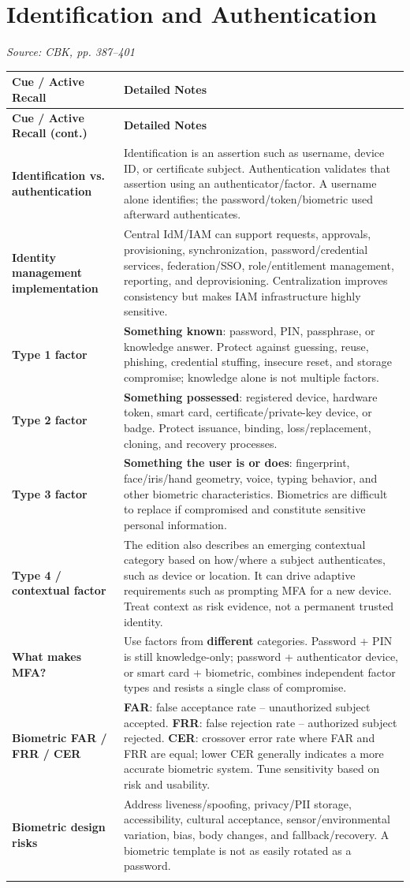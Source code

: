 \documentclass[10pt,letterpaper]{article}
\makeatletter
\newenvironment{cornell}{\rowcolors{2}{white}{notebg}\begin{longtable}{@{}>{\raggedright\arraybackslash\columncolor{cuebg}\color{navy}\bfseries}p{0.285\textwidth}>{\raggedright\arraybackslash}p{0.65\textwidth}@{}}\rowcolor{navy}\color{white}\textbf{Cue / Active Recall} & \color{white}\textbf{Detailed Notes}\\ \hline\endfirsthead\rowcolor{navy}\color{white}\textbf{Cue / Active Recall (cont.)} & \color{white}\textbf{Detailed Notes}\\ \hline\endhead}{\end{longtable}}
\newcommand{\noterow}[2]{#1 & #2\\\arrayrulecolor{line}\hline}\newcommand{\source}[1]{\par{\footnotesize\color{teal}\textit{Source: CBK, #1}}\par}
\makeatother
\begin{document}
\section{\color{navy}Identification and Authentication}
\source{pp. 387--401}
\begin{cornell}
\noterow{Identification vs. authentication}{Identification is an assertion such as username, device ID, or certificate subject. Authentication validates that assertion using an authenticator/factor. A username alone identifies; the password/token/biometric used afterward authenticates.}
\noterow{Identity management implementation}{Central IdM/IAM can support requests, approvals, provisioning, synchronization, password/credential services, federation/SSO, role/entitlement management, reporting, and deprovisioning. Centralization improves consistency but makes IAM infrastructure highly sensitive.}
\noterow{Type 1 factor}{\textbf{Something known}: password, PIN, passphrase, or knowledge answer. Protect against guessing, reuse, phishing, credential stuffing, insecure reset, and storage compromise; knowledge alone is not multiple factors.}
\noterow{Type 2 factor}{\textbf{Something possessed}: registered device, hardware token, smart card, certificate/private-key device, or badge. Protect issuance, binding, loss/replacement, cloning, and recovery processes.}
\noterow{Type 3 factor}{\textbf{Something the user is or does}: fingerprint, face/iris/hand geometry, voice, typing behavior, and other biometric characteristics. Biometrics are difficult to replace if compromised and constitute sensitive personal information.}
\noterow{Type 4 / contextual factor}{The edition also describes an emerging contextual category based on how/where a subject authenticates, such as device or location. It can drive adaptive requirements such as prompting MFA for a new device. Treat context as risk evidence, not a permanent trusted identity.}
\noterow{What makes MFA?}{Use factors from \textbf{different} categories. Password + PIN is still knowledge-only; password + authenticator device, or smart card + biometric, combines independent factor types and resists a single class of compromise.}
\noterow{Biometric FAR / FRR / CER}{\textbf{FAR}: false acceptance rate -- unauthorized subject accepted. \textbf{FRR}: false rejection rate -- authorized subject rejected. \textbf{CER}: crossover error rate where FAR and FRR are equal; lower CER generally indicates a more accurate biometric system. Tune sensitivity based on risk and usability.}
\noterow{Biometric design risks}{Address liveness/spoofing, privacy/PII storage, accessibility, cultural acceptance, sensor/environmental variation, bias, body changes, and fallback/recovery. A biometric template is not as easily rotated as a password.}

\end{cornell}
\end{document}
